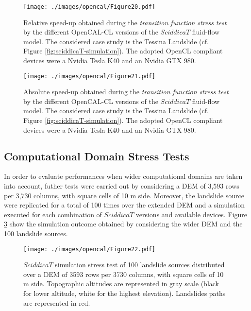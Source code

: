 \begin{figure}
	\begin{center}
		\texttt{[image: ./images/opencal/Figure20.pdf]}
		\caption{Relative speed-up obtained during the \emph{transition function stress
				test} by the different OpenCAL-CL versions of the $SciddicaT$
			fluid-flow model. The considered case study is the Tessina Landslide
			(cf. Figure \ref{fig:sciddicaT-simulation}). The adopted OpenCL
			compliant devices were a Nvidia Tesla K40 and an Nvidia GTX 980.}
		\label{gr:sciddicaT-CL-relative-speed-up-stress}
	\end{center}
\end{figure}

\begin{figure}
	\begin{center}
		\texttt{[image: ./images/opencal/Figure21.pdf]}
		\caption{Absolute speed-up obtained during the \emph{transition function stress
				test} by the different OpenCAL-CL versions of the $SciddicaT$
			fluid-flow model. The considered case study is the Tessina Landslide
			(cf. Figure \ref{fig:sciddicaT-simulation}). The adopted OpenCL
			compliant devices were a Nvidia Tesla K40 and an Nvidia GTX 980.}
		\label{gr:sciddicaT-CL-absolute-speed-up-stress}
	\end{center}
\end{figure}
\subsection{Computational Domain Stress Tests}
In order to evaluate performances when wider computational domains
are taken into account, futher tests were carried out by
considering a DEM of 3,593 rows per 3,730 columns, with square
cells of 10 m side. Moreover, the landslide source were replicated
for a total of 100 times over the extended DEM and a simulation
executed for each combination of $SciddicaT$ versions and
available devices. Figure \ref{fig:stresstestR} show the
simulation outcome obtained by considering the wider DEM and the
100 landslide sources.

\begin{figure}
	\begin{center}
		\texttt{[image: ./images/opencal/Figure22.pdf]}
		\caption{$SciddicaT$ simulation stress test of 100 landslide sources
			distributed over a DEM of 3593 rows per 3730 columns, with square
			cells of 10 m side. Topographic altitudes are represented in gray
			scale (black for lower altitude, white for the highest
			elevation). Landslides paths are represented in red.}
		\label{fig:stresstestR}
	\end{center}
\end{figure}

